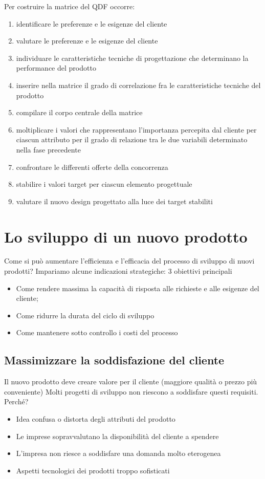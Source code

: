 \documentclass{article}
\begin{document}
Per costruire la matrice del QDF occorre:
\begin{enumerate}
	\item identificare le preferenze e le esigenze del cliente
	\item valutare le preferenze e le esigenze del cliente
	\item individuare le caratteristiche tecniche di progettazione che
	determinano la performance del prodotto
	\item inserire nella matrice il grado di correlazione fra le
	caratteristiche tecniche del prodotto
	\item compilare il corpo centrale della matrice
	\item	moltiplicare i valori che rappresentano l’importanza
	percepita dal cliente per ciascun attributo per il grado di
	relazione tra le due variabili determinato nella fase
	precedente
	\item	confrontare le differenti offerte della concorrenza
	\item	stabilire i valori target per ciascun elemento progettuale
	\item	valutare il nuovo design progettato alla luce dei target stabiliti
\end{enumerate}
\section{Lo sviluppo di un nuovo prodotto}

Come si può aumentare l’efficienza e l’efficacia del processo di
sviluppo di nuovi prodotti?
Impariamo alcune indicazioni strategiche: 3 obiettivi principali
\begin{itemize}
	\item Come rendere massima la capacità di risposta alle richieste e
	alle esigenze del cliente;
	\item  Come ridurre la durata del ciclo di sviluppo
	\item  Come mantenere sotto controllo i costi del processo
\end{itemize}

\subsection{Massimizzare la soddisfazione del cliente}
Il nuovo prodotto deve creare valore per il cliente (maggiore qualità
o prezzo più conveniente)
Molti progetti di sviluppo non riescono a soddisfare questi requisiti.
Perché?
\begin{itemize}
	\item Idea confusa o distorta degli attributi del prodotto
	\item  Le imprese sopravvalutano la disponibilità del cliente a spendere
	\item  L’impresa non riesce a soddisfare una domanda molto
	eterogenea
	\item  Aspetti tecnologici dei prodotti troppo sofisticati
\end{itemize}
\end{document}
